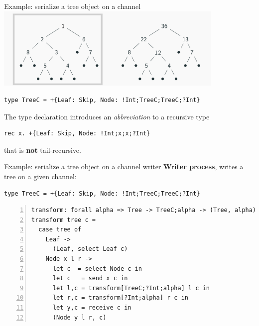 \documentclass[10pt]{beamer}
\begin{document}
\begin{frame}[fragile]{Example:  serialize a tree object on a channel \hfill {}}
\pause
\vspace{-4cm}
\includegraphics[width=11cm]{img/treesumL}
\pause

\begin{lstlisting}
type TreeC = +{Leaf: Skip, Node: !Int;TreeC;TreeC;?Int}
\end{lstlisting}
The type declaration introduces an \emph{abbreviation} to a recursive
type
\begin{lstlisting}
rec x. +{Leaf: Skip, Node: !Int;x;x;?Int}
\end{lstlisting}
that is \textbf{not} tail-recursive.
\end{frame}

\newcommand\hlmarkerstyle[5][yellow]{%
    \draw [ line width = \baselineskip, #1 ] (#2, #3) -- (#4, #5);
}
\let\hldefaultstyle=\hlmarkerstyle

\begin{frame}[fragile]{Example:  serialize a tree object on a channel \hfill{\color{mLightBrown}writer}}
	\textbf{Writer process}, writes a tree on a given channel:
	
\begin{lstlisting}
type TreeC = +{Leaf: Skip, Node: !Int;TreeC;TreeC;?Int}
\end{lstlisting}
\begin{lstlisting}[numbers=left, xleftmargin=0.7cm, escapeinside=\`\`]
transform: forall alpha => Tree -> TreeC;alpha -> (Tree, alpha)
transform tree c =
  case tree of
    Leaf ->
      (Leaf, select Leaf c)
    Node x l r ->
      let c  = select Node c in
      let c   = send x c in 
      let l,c = transform[TreeC;?Int;alpha] l c in
      let r,c = transform[?Int;alpha] r c in
      let y,c = receive c in
      (Node y l r, c)
\end{lstlisting}
\end{frame}
\end{document}
